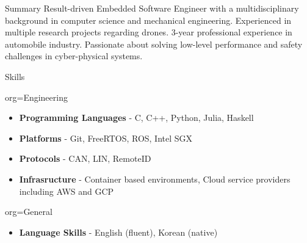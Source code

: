 \documentclass{resume}
\begin{document}
\makeheader
\begin{ResumeSection}{Summary}
    Result-driven Embedded Software Engineer with a multidisciplinary background in computer science and mechanical engineering. Experienced in multiple research projects regarding drones. 3-year professional experience in automobile industry. Passionate about solving low-level performance and safety challenges in cyber-physical systems.
\end{ResumeSection}

\begin{ResumeSection}{Skills}
    \newcommand{\skill}[2]{\textbf{#1} - #2}
    \begin{ResumeSubsection}{org=Engineering}
        \begin{itemize}
            \item \skill{Programming Languages}{C, C++, Python, Julia, Haskell}
            \item \skill{Platforms}{Git, FreeRTOS, ROS, Intel SGX}
            \item \skill{Protocols}{CAN, LIN, RemoteID}
            \item \skill{Infrasructure}{Container based environments, Cloud service providers including AWS and GCP}
        \end{itemize}
    \end{ResumeSubsection}
    \begin{ResumeSubsection}{org=General}
        \begin{itemize}
            \item \skill{Language Skills}{English (fluent), Korean (native)}
        \end{itemize}
    \end{ResumeSubsection}
\end{ResumeSection}
\end{document}
